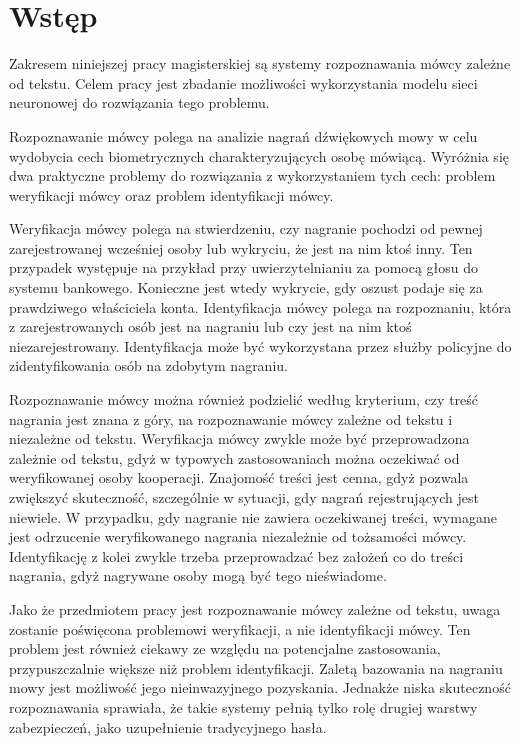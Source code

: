 \chapter{Wstęp}\label{chap:wstep}

Zakresem niniejszej pracy magisterskiej są systemy rozpoznawania mówcy zależne od tekstu. Celem
pracy jest zbadanie możliwości wykorzystania modelu sieci neuronowej do rozwiązania tego problemu.

Rozpoznawanie mówcy polega na analizie nagrań dźwiękowych mowy w celu wydobycia cech biometrycznych
charakteryzujących osobę mówiącą. Wyróżnia się dwa praktyczne problemy do rozwiązania z wykorzystaniem tych
cech: problem weryfikacji mówcy oraz problem identyfikacji mówcy.

Weryfikacja mówcy polega na stwierdzeniu, czy nagranie pochodzi od pewnej zarejestrowanej wcześniej osoby
lub wykryciu, że jest na nim ktoś inny. Ten przypadek występuje na przykład przy uwierzytelnianiu za pomocą głosu
do systemu bankowego. Konieczne jest wtedy wykrycie, gdy oszust podaje się za prawdziwego właściciela konta.
Identyfikacja mówcy polega na rozpoznaniu, która z zarejestrowanych osób jest na nagraniu lub czy
jest na nim ktoś niezarejestrowany. Identyfikacja może być wykorzystana przez służby policyjne do
zidentyfikowania osób na zdobytym nagraniu.

Rozpoznawanie mówcy można również podzielić według kryterium, czy treść nagrania jest znana z góry,
na rozpoznawanie mówcy zależne od tekstu i niezależne od tekstu. Weryfikacja mówcy zwykle może
być przeprowadzona zależnie od tekstu, gdyż w typowych zastosowaniach można oczekiwać od weryfikowanej
osoby kooperacji. Znajomość treści jest cenna, gdyż pozwala zwiększyć skuteczność, szczególnie w sytuacji,
gdy nagrań rejestrujących jest niewiele\cite{parallelSpeakerAnd}. W przypadku,
gdy nagranie nie zawiera oczekiwanej treści, wymagane jest odrzucenie weryfikowanego nagrania
niezależnie od tożsamości mówcy.
Identyfikację z kolei zwykle trzeba przeprowadzać bez założeń co do treści nagrania, gdyż nagrywane osoby mogą
być tego nieświadome.

Jako że przedmiotem pracy jest rozpoznawanie mówcy zależne od tekstu, uwaga zostanie poświęcona problemowi
weryfikacji, a nie identyfikacji mówcy. Ten problem jest również ciekawy ze względu na potencjalne zastosowania,
przypuszczalnie większe niż problem identyfikacji. Zaletą bazowania na nagraniu mowy jest możliwość
jego nieinwazyjnego pozyskania. Jednakże niska skuteczność rozpoznawania sprawiała, że takie systemy
pełnią tylko rolę drugiej warstwy zabezpieczeń, jako uzupełnienie tradycyjnego hasła.

